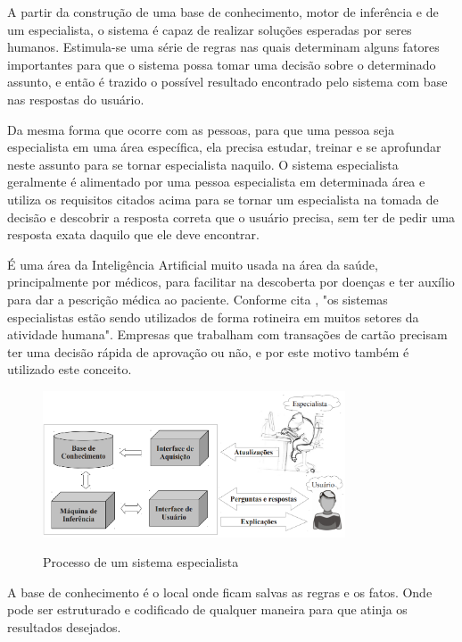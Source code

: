 
A partir da construção de uma base de conhecimento,  motor de inferência e de um especialista, o sistema é capaz de realizar soluções esperadas por seres humanos. Estimula-se uma série de regras nas quais determinam alguns fatores importantes para que o sistema possa tomar uma decisão sobre o determinado assunto, e então é trazido o possível resultado encontrado pelo sistema com base nas respostas do usuário.

Da mesma forma que ocorre com as pessoas, para que uma pessoa seja especialista em uma área específica, ela precisa estudar, treinar e se aprofundar  neste assunto para se tornar especialista naquilo.
O sistema especialista geralmente é alimentado por uma pessoa especialista em determinada área e utiliza os requisitos citados acima para se tornar um especialista na tomada de decisão e descobrir a resposta correta que o usuário precisa, sem ter de pedir uma resposta exata daquilo que ele deve encontrar. \cite{Jones}

É uma área da Inteligência Artificial muito usada na área da saúde, principalmente por médicos, para facilitar na descoberta por doenças e ter auxílio para dar a pescrição médica ao paciente. Conforme cita , "os sistemas especialistas estão sendo utilizados de forma rotineira em muitos setores da atividade humana".
Empresas que trabalham com transações de cartão precisam ter uma decisão rápida de aprovação ou não, e por este motivo também é utilizado este conceito.

\begin{figure}[H]
    \centering
    \caption{Processo de um sistema especialista}
    \includegraphics[width=0.8\textwidth]{figura1.PNG}
    \label{processosistema}
\end{figure}

A base de conhecimento é o local onde ficam salvas as regras e os fatos. Onde pode ser estruturado e codificado de qualquer maneira para que atinja os resultados desejados.

